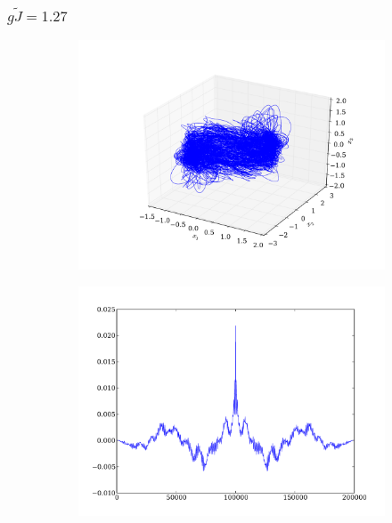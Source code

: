 \documentclass{beamer}
\begin{document}

\begin{frame}
\frametitle{$g\tilde{J} = 1.27$}
\begin{figure}
	\centering
	\begin{subfigure}[b]{0.49\textwidth}
		\includegraphics[width=\textwidth]{paulfigs/J_1_27_3d}
	\end{subfigure}
	\begin{subfigure}[b]{0.49\textwidth}
		\includegraphics[width=\textwidth]{paulfigs/tcorr_J_1_27}
	\end{subfigure}
\end{figure}
\end{frame}
\end{document}
